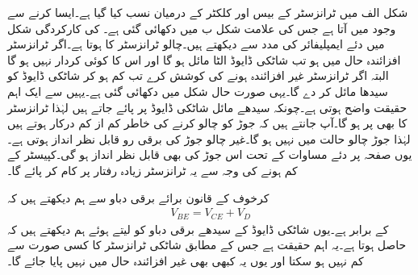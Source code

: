 شکل  الف میں ٹرانزسٹر کے بیس اور کلکٹر  کے درمیان  نسب کیا گیا ہے۔ایسا کرنے سے  وجود میں آتا ہے جس کی علامت شکل  ب میں دکھائی گئی ہے۔ کی کارکردگی شکل  میں دئے ایمپلیفائر کی مدد سے دیکھتے ہیں۔چالو ٹرانزسٹر کا  ہوتا ہے۔اگر ٹرانزسٹر افزائندہ حال میں ہو تب شاٹکی ڈایوڈ الٹا مائل ہو گا اور اس کا کوئی کردار نہیں ہو گا البتہ اگر ٹرانزسٹر غیر افزائندہ ہونے کی کوشش کرے تب   کم ہو کر  شاٹکی ڈایوڈ کو سیدھا مائل کر دے گا۔یہی صورت حال شکل میں دکھائی گئی ہے۔یہیں سے ایک اہم حقیقت واضح ہوتی ہے۔چونکہ سیدھے مائل شاٹکی ڈایوڈ پر  پائے جاتے ہیں لہٰذا ٹرانزسٹر کا  بھی  پر ہو گا۔آپ جانتے ہیں کہ  جوڑ کو چالو کرنے کی خاطر کم از کم  درکار ہوتے ہیں لہٰذا  جوڑ چالو حالت میں نہیں ہو گا۔غیر چالو جوڑ کی برقی رو قابل نظر انداز ہوتی ہے۔یوں صفحہ  پر دئے مساوات  کے تحت اس جوڑ کی  بھی قابل نظر انداز ہو گی۔کپیسٹر کے کم ہونے کی وجہ سے یہ ٹرانزسٹر زیادہ رفتار پر کام کر پائے گا۔

کرخوف کے قانون برائے برقی دباو سے ہم دیکھتے ہیں کہ
\begin{align*}
V_{BE}=V_{CE}+V_D
\end{align*}
کے برابر ہے۔یوں شاٹکی ڈایوڈ کے سیدھے برقی دباو کو  لیتے ہوئے ہم دیکھتے ہیں کہ  حاصل ہوتا ہے۔یہ اہم حقیقت ہے جس کے مطابق شاٹکی ٹرانزسٹر کا  کسی صورت  سے کم نہیں ہو سکتا اور یوں یہ کبھی بھی غیر افزائندہ حال میں نہیں پایا جائے گا۔


